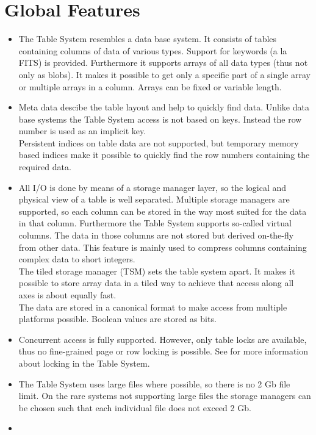 \section{Global Features}
\begin{itemize}
\item
The Table System resembles a data base system. It consists of tables
containing columns of data of various types. Support for keywords
(a la FITS) is provided. Furthermore it supports arrays of all data
types (thus not only as blobs). It makes it possible to get only a
specific part of a single array or multiple arrays in a column.
Arrays can be fixed or variable length.
\item
Meta data descibe the table layout and help to quickly find data.
Unlike data base systems the Table System access is not based on keys.
Instead the row number is used as an implicit key.
\\Persistent indices on table data are not supported, but
temporary memory based indices make it possible to quickly find
the row numbers containing the required data.
\item
All I/O is done by means of a storage manager layer, so
the logical and physical view of a table is well separated.
Multiple storage managers are supported, so each column
can be stored in the way most suited for the data in that column.
Furthermore the Table System supports so-called virtual columns. The
data in those columns are not stored but derived on-the-fly from
other data. This feature is mainly used to compress columns
containing complex data to short integers.
\\The tiled storage manager (TSM) sets the table system apart.
It makes it possible to store array data in a tiled way to achieve that
access along all axes is about equally fast.
\\The data are stored in a canonical format to make access from
multiple platforms possible. Boolean values are stored as bits.
\item
Concurrent access is fully supported. However, only table locks are
available, thus no fine-grained page or row locking is possible.
See  for more
information about locking in the Table System.
\item The Table System uses large files where possible, so there is
no 2 Gb file limit. On the rare systems not supporting large files
the storage managers can be chosen such that each individual file does
not exceed 2 Gb.
\item

\end{itemize}
